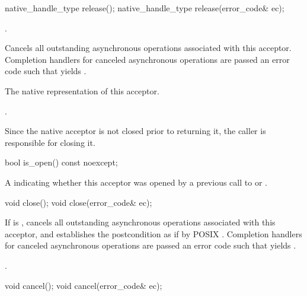 \begin{itemdecl}
native_handle_type release();
native_handle_type release(error_code& ec);
\end{itemdecl}

\begin{itemdescr}
\pnum
\expects {}.

\pnum
\effects Cancels all outstanding asynchronous operations associated with this acceptor.
Completion handlers for canceled asynchronous operations are passed an error code 
such that  yields .

\pnum
\returns The native representation of this acceptor.

\pnum
\postconditions {}.

\pnum
\remarks Since the native acceptor is not closed prior to returning it,
the caller is responsible for closing it.
\end{itemdescr}

\begin{itemdecl}
bool is_open() const noexcept;
\end{itemdecl}

\begin{itemdescr}
\pnum
\returns A  indicating whether this acceptor was opened by a previous call to  or .
\end{itemdescr}

\begin{itemdecl}
void close();
void close(error_code& ec);
\end{itemdecl}

\begin{itemdescr}
\pnum
\effects If  is , cancels all outstanding asynchronous operations associated with this acceptor, and establishes the postcondition as if by POSIX . Completion handlers for canceled asynchronous operations are passed an error code  such that  yields .

\pnum
\postconditions {}.
\end{itemdescr}

\begin{itemdecl}
void cancel();
void cancel(error_code& ec);
\end{itemdecl}

